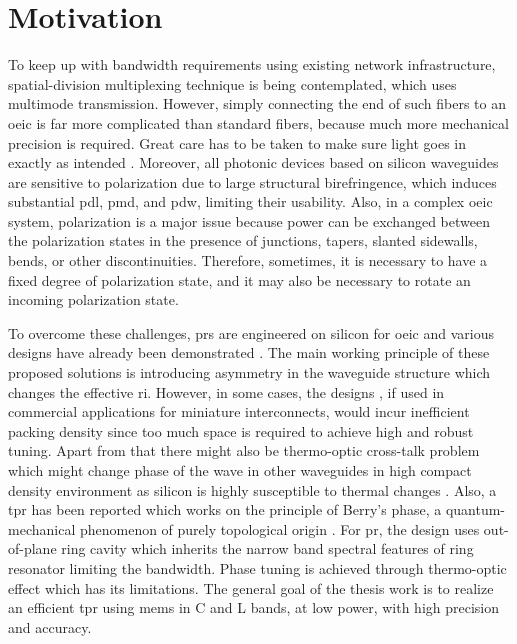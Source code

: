 \documentclass[../report.tex]{subfiles}
\begin{document}
	\section{Motivation} 
 To keep up with bandwidth requirements using existing network infrastructure, spatial-division multiplexing technique \cite{space_richardson_2013} is being contemplated, which uses multimode transmission. However, simply connecting the end of such fibers to an \gls{oeic} is far more complicated than standard fibers, because much more mechanical precision is required. Great care has to be taken to make sure light goes in exactly as intended \cite{hecht_is_2016}. Moreover, all photonic devices based on silicon waveguides are sensitive to polarization due to large structural birefringence, which induces substantial \gls{pdl}, \gls{pmd}, and \gls{pdw}, limiting their usability. Also, in a complex \gls{oeic} system, polarization is a major issue because power can be exchanged between the polarization states in the presence of junctions, tapers, slanted sidewalls, bends, or other discontinuities. Therefore, sometimes, it is necessary to have a fixed degree of polarization state, and it may also be necessary to rotate an incoming polarization state. \par

To overcome these challenges, \gls{pr}s are engineered on silicon for \gls{oeic} and various designs have already been demonstrated \cite{xie_efficient_2015,velasco_ultracompact_2012,leung_numerical_2011,wang_design_2014,dai_novel_2011,wirth_efficient_2012,chen_compact_2011}. The main working principle of these proposed solutions is introducing asymmetry in the waveguide structure which changes the effective \gls{ri}. However, in some cases, the designs \cite{sarmiento-merenguel_demonstration_2015}, if used in commercial applications for miniature interconnects, would incur inefficient packing density since too much space is required to achieve high and robust tuning. Apart from that there might also be thermo-optic cross-talk problem which might change phase of the wave in other waveguides in high compact density environment as silicon is highly susceptible to thermal changes \cite{ibrahim_athermal_2012}. Also, a \gls{tpr} has been reported which works on the principle of Berry’s phase, a quantum-mechanical phenomenon of purely topological origin \cite{xu_electrically_2014}. For \gls{pr}, the design uses out-of-plane ring cavity which inherits the narrow band spectral features of ring resonator limiting the bandwidth. Phase tuning is achieved through thermo-optic effect which has its limitations. The general goal of the thesis work is to realize an efficient \gls{tpr} using \gls{mems} in C and L bands, at low power, with high precision and accuracy.    
\end{document}
